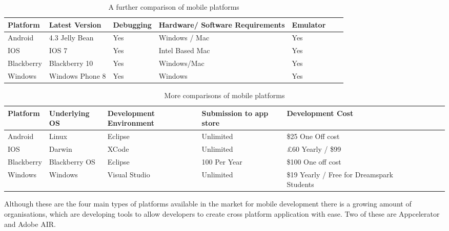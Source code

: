 \begin{table}[!ht]
    \begin{tabular}{|l|l|l|l|l|l|l|}
    \hline
    Platform   & Latest Version    & Debugging & Hardware/ Software Requirements & Emulator \\ \hline
    Android    & 4.3 Jelly   Bean  & Yes       & Windows   / Mac & Yes \\ \hline
    IOS        & IOS 7             & Yes       & Intel   Based Mac               & Yes  \\ \hline
    Blackberry & Blackberry   10   & Yes       & Windows/Mac                     & Yes \\ \hline
    Windows    & Windows   Phone 8 & Yes       & Windows                         & Yes \\ \hline
    \end{tabular}
    \caption {A further comparison of mobile platforms}
\end{table}

\begin{table}[!ht]
    \begin{tabular}{|p{2.5cm}|p{2.5cm}|p{2.5cm}|p{2.5cm}|p{2.5cm}|l|l|l|l|l|}
    \hline
        Platform   & Underlying OS &     Development Environment  &   Submission to app store & Development Cost                            \\ \hline
        Android    &   Linux       & Eclipse                      &   Unlimited               & \$25 One Off cost                            \\ \hline
        IOS        & Darwin        & XCode                        &   Unlimited               & \pounds60 Yearly / \$99                            \\ \hline
        Blackberry & Blackberry OS & Eclipse                      & 100 Per Year              & \$100 One off cost                           \\ \hline
        Windows    & Windows       &   Visual Studio              & Unlimited                 & \$19 Yearly / Free for Dreamspark   Students \\ \hline
    \end{tabular}
    \caption {More comparisons of mobile platforms}
\end{table}

Although these are the four main types of platforms available in the market for mobile development there is a growing amount of organisations, which are developing tools to allow developers to create cross platform application with ease. Two of these are Appcelerator and Adobe AIR.

